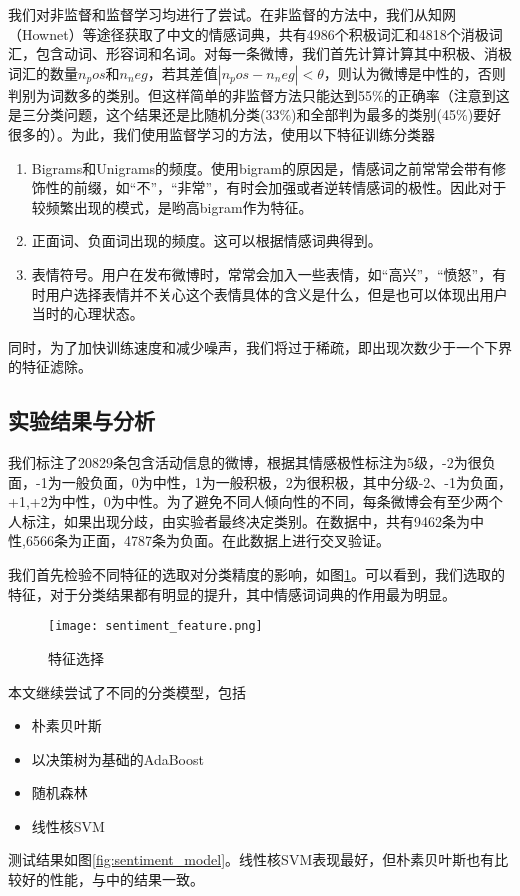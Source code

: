 我们对非监督和监督学习均进行了尝试。在非监督的方法中，我们从知网（Hownet）等途径获取了中文的情感词典，共有4986个积极词汇和4818个消极词汇，包含动词、形容词和名词。对每一条微博，我们首先计算计算其中积极、消极词汇的数量$n_pos$和$n_neg$，若其差值$|n_pos-n_neg|<\theta$，则认为微博是中性的，否则判别为词数多的类别。但这样简单的非监督方法只能达到55\%的正确率（注意到这是三分类问题，这个结果还是比随机分类(33\%)和全部判为最多的类别(45\%)要好很多的）。为此，我们使用监督学习的方法，使用以下特征训练分类器

\begin{enumerate}
\item Bigrams和Unigrams的频度。使用bigram的原因是，情感词之前常常会带有修饰性的前缀，如``不''，``非常''，有时会加强或者逆转情感词的极性。因此对于较频繁出现的模式，是哟高bigram作为特征。
\item 正面词、负面词出现的频度。这可以根据情感词典得到。
\item 表情符号。用户在发布微博时，常常会加入一些表情，如``高兴''，``愤怒''，有时用户选择表情并不关心这个表情具体的含义是什么，但是也可以体现出用户当时的心理状态。
\end{enumerate}
同时，为了加快训练速度和减少噪声，我们将过于稀疏，即出现次数少于一个下界的特征滤除。

\subsection{实验结果与分析}

我们标注了20829条包含活动信息的微博，根据其情感极性标注为5级，-2为很负面，-1为一般负面，0为中性，1为一般积极，2为很积极，其中分级-2、-1为负面，+1,+2为中性，0为中性。为了避免不同人倾向性的不同，每条微博会有至少两个人标注，如果出现分歧，由实验者最终决定类别。在数据中，共有9462条为中性,6566条为正面，4787条为负面。在此数据上进行交叉验证。

我们首先检验不同特征的选取对分类精度的影响，如图\ref{fig:sentiment_feature}。可以看到，我们选取的特征，对于分类结果都有明显的提升，其中情感词词典的作用最为明显。
\begin{figure}[!h]
\centering
\texttt{[image: sentiment\_feature.png]}
\caption{特征选择}
\label{fig:sentiment_feature}
\end{figure}

本文继续尝试了不同的分类模型，包括
\begin{itemize}
\item 朴素贝叶斯
\item 以决策树为基础的AdaBoost
\item 随机森林
\item 线性核SVM
\end{itemize}
测试结果如图\ref{fig:sentiment_model}。线性核SVM表现最好，但朴素贝叶斯也有比较好的性能，与\cite{pang2002thumbs}中的结果一致。

